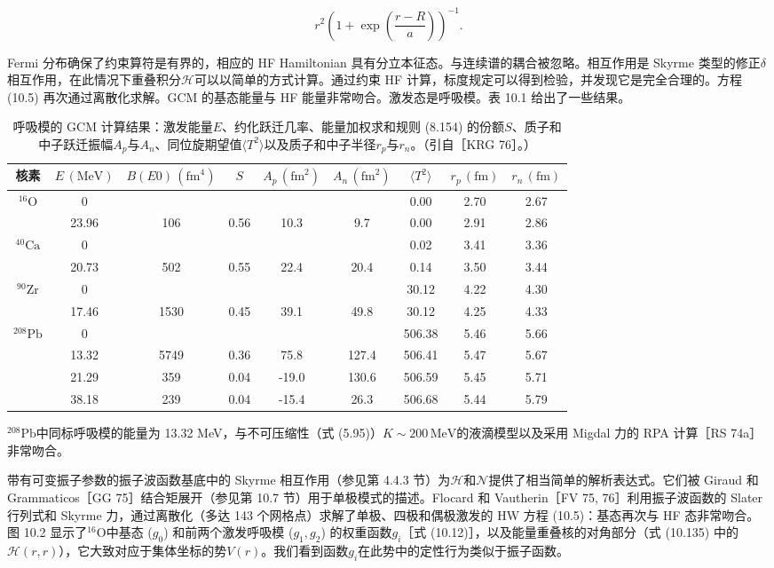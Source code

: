 \[
r^{2}\left(1+\exp\left(\frac{r-R}{a}\right)\right)^{-1}.
\]

Fermi 分布确保了约束算符是有界的，相应的 HF Hamiltonian 具有分立本征态。与连续谱的耦合被忽略。相互作用是 Skyrme
类型的修正$\delta$相互作用，在此情况下重叠积分$\mathscr{H}$可以以简单的方式计算。通过约束 HF 计算，标度规定可以得到检验，并发现它是完全合理的。方程
(10.5) 再次通过离散化求解。GCM 的基态能量与 HF 能量非常吻合。激发态是呼吸模。表 10.1 给出了一些结果。

\begin{table}[htbp]
\caption{\label{tab:10.1}呼吸模的 GCM 计算结果：激发能量$E$、约化跃迁几率、能量加权求和规则 (8.154) 的份额$S$、质子和中子跃迁振幅$A_{p}$与$A_{n}$、同位旋期望值$\langle T^{2}\rangle$以及质子和中子半径$r_{p}$与$r_{n}$。（引自［KRG
76］。）}

\centering{}%
\begin{tabular}{ccccccccc}
\toprule 
核素 & $E\,(\mathrm{MeV})$ & $B(E0)\,(\mathrm{fm}^{4})$ & $S$ & $A_{p}\,(\mathrm{fm}^{2})$ & $A_{n}\,(\mathrm{fm}^{2})$ & $\langle T^{2}\rangle$ & $r_{p}\,(\mathrm{fm})$ & $r_{n}\,(\mathrm{fm})$\tabularnewline
\midrule
$^{16}\mathrm{O}$ & 0 &  &  &  &  & 0.00 & 2.70 & 2.67\tabularnewline
 & 23.96 & 106 & 0.56 & 10.3 & 9.7 & 0.00 & 2.91 & 2.86\tabularnewline
$^{40}\mathrm{Ca}$ & 0 &  &  &  &  & 0.02 & 3.41 & 3.36\tabularnewline
 & 20.73 & 502 & 0.55 & 22.4 & 20.4 & 0.14 & 3.50 & 3.44\tabularnewline
$^{90}\mathrm{Zr}$ & 0 &  &  &  &  & 30.12 & 4.22 & 4.30\tabularnewline
 & 17.46 & 1530 & 0.45 & 39.1 & 49.8 & 30.12 & 4.25 & 4.33\tabularnewline
$^{208}\mathrm{Pb}$ & 0 &  &  &  &  & 506.38 & 5.46 & 5.66\tabularnewline
 & 13.32 & 5749 & 0.36 & 75.8 & 127.4 & 506.41 & 5.47 & 5.67\tabularnewline
 & 21.29 & 359 & 0.04 & -19.0 & 130.6 & 506.59 & 5.45 & 5.71\tabularnewline
 & 38.18 & 239 & 0.04 & -15.4 & 26.3 & 506.68 & 5.44 & 5.79\tabularnewline
\bottomrule
\end{tabular}
\end{table}

$^{208}\mathrm{Pb}$中同标呼吸模的能量为 13.32 MeV，与不可压缩性（式 (5.95)）$K\sim200\,\text{MeV}$的液滴模型以及采用
Migdal 力的 RPA 计算［RS 74a］非常吻合。

带有可变振子参数的振子波函数基底中的 Skyrme 相互作用（参见第 4.4.3 节）为$\mathscr{H}$和$\mathscr{N}$提供了相当简单的解析表达式。它们被
Giraud 和 Grammaticos［GG 75］结合矩展开（参见第 10.7 节）用于单极模式的描述。Flocard 和 Vautherin［FV
75, 76］利用振子波函数的 Slater 行列式和 Skyrme 力，通过离散化（多达 143 个网格点）求解了单极、四极和偶极激发的
HW 方程 (10.5)：基态再次与 HF 态非常吻合。图 10.2 显示了$^{16}\mathrm{O}$中基态 ($g_{0}$)
和前两个激发呼吸模 ($g_{1},g_{2}$) 的权重函数$g_{i}$［式 (10.12)］，以及能量重叠核的对角部分（式
(10.135) 中的$\mathscr{H}(r,r)$），它大致对应于集体坐标的势$V(r)$。我们看到函数$g_{i}$在此势中的定性行为类似于振子函数。

